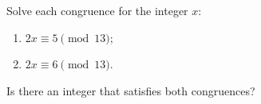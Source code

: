 Solve each congruence for the integer $x$:
\begin{enumerate}
\item[(a)] $2x\equiv5\pmod{13}$;
\item[(b)] $2x\equiv6\pmod{13}$.
\end{enumerate}
Is there an integer that satisfies both congruences?
